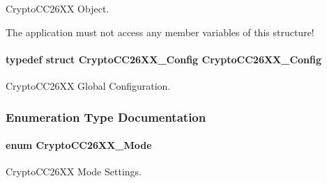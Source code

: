 Crypto\-C\-C26\-X\-X Object. 

The application must not access any member variables of this structure! 
\paragraph[{Crypto\-C\-C26\-X\-X\-\_\-\-Config}]{\setlength{\rightskip}{0pt plus 5cm}typedef struct {\bf Crypto\-C\-C26\-X\-X\-\_\-\-Config}  {\bf Crypto\-C\-C26\-X\-X\-\_\-\-Config}}\label{_crypto_c_c26_x_x_8h_a7ff3fbcb90bc60cea7c5a281d5c7add2}


Crypto\-C\-C26\-X\-X Global Configuration. 



\subsubsection{Enumeration Type Documentation}
\paragraph[{Crypto\-C\-C26\-X\-X\-\_\-\-Mode}]{\setlength{\rightskip}{0pt plus 5cm}enum {\bf Crypto\-C\-C26\-X\-X\-\_\-\-Mode}}\label{_crypto_c_c26_x_x_8h_abf86c8ac428559f00fed3299d439e2cd}


Crypto\-C\-C26\-X\-X Mode Settings. 

